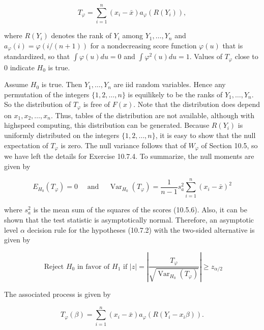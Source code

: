 \begin{equation*}
T_{\varphi}=\sum_{i=1}^{n}\left(x_{i}-\bar{x}\right) a_{\varphi}\left(R\left(Y_{i}\right)\right), \tag{10.7.4}
\end{equation*}


where $R\left(Y_{i}\right)$ denotes the rank of $Y_{i}$ among $Y_{1}, \ldots, Y_{n}$ and $a_{\varphi}(i)=\varphi(i /(n+1))$ for a nondecreasing score function $\varphi(u)$ that is standardized, so that $\int \varphi(u) d u=0$ and $\int \varphi^{2}(u) d u=1$. Values of $T_{\varphi}$ close to 0 indicate $H_{0}$ is true.

Assume $H_{0}$ is true. Then $Y_{1}, \ldots, Y_{n}$ are iid random variables. Hence any permutation of the integers $\{1,2, \ldots, n\}$ is equilikely to be the ranks of $Y_{1}, \ldots, Y_{n}$. So the distribution of $T_{\varphi}$ is free of $F(x)$. Note that the distribution does depend on $x_{1}, x_{2}, \ldots, x_{n}$. Thus, tables of the distribution are not available, although with highspeed computing, this distribution can be generated. Because $R\left(Y_{i}\right)$ is uniformly distributed on the integers $\{1,2, \ldots, n\}$, it is easy to show that the null expectation of $T_{\varphi}$ is zero. The null variance follows that of $W_{\varphi}$ of Section 10.5, so we have left the details for Exercise 10.7.4. To summarize, the null moments are given by


\begin{equation*}
E_{H_{0}}\left(T_{\varphi}\right)=0 \quad \text { and } \quad \operatorname{Var}_{H_{0}}\left(T_{\varphi}\right)=\frac{1}{n-1} s_{a}^{2} \sum_{i=1}^{n}\left(x_{i}-\bar{x}\right)^{2} \tag{10.7.5}
\end{equation*}


where $s_{a}^{2}$ is the mean sum of the squares of the scores (10.5.6). Also, it can be shown that the test statistic is asymptotically normal. Therefore, an asymptotic level $\alpha$ decision rule for the hypotheses (10.7.2) with the two-sided alternative is given by


\begin{equation*}
\text { Reject } H_{0} \text { in favor of } H_{1} \text { if }|z|=\left|\frac{T_{\varphi}}{\sqrt{\operatorname{Var}_{H_{0}}\left(T_{\varphi}\right)}}\right| \geq z_{\alpha / 2} \tag{10.7.6}
\end{equation*}


The associated process is given by


\begin{equation*}
T_{\varphi}(\beta)=\sum_{i=1}^{n}\left(x_{i}-\bar{x}\right) a_{\varphi}\left(R\left(Y_{i}-x_{i} \beta\right)\right) . \tag{10.7.7}
\end{equation*}


